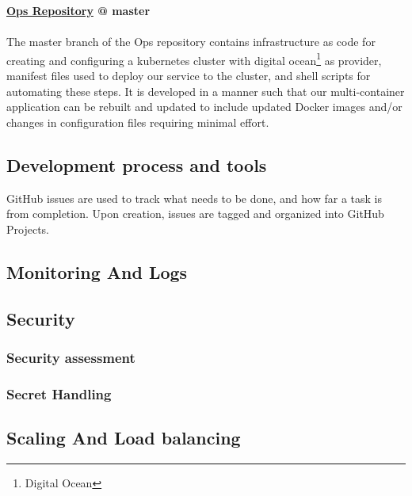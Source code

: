 \textbf{\hyperref[app:opsRepo]{Ops Repository} @ master}\\\\
The master branch of the Ops repository contains infrastructure as code for creating and configuring a kubernetes cluster with digital ocean\footnote{Digital Ocean\cite{Digitalocean}} as provider, manifest files used to deploy our service to the cluster, and shell scripts for automating these steps. It is developed in a manner such that our multi-container application can be rebuilt and updated to include updated Docker images and/or changes in configuration files requiring minimal effort.

\subsection{Development process and tools}
\label{subsec:process&tools}
 GitHub issues are used to track what needs to be done, and how far a task is from completion. Upon creation, issues are tagged and organized into GitHub Projects.

\subsection{Monitoring And Logs}
\label{subsec:monitoring}

\subsection{Security}
\label{subsec:security}

\subsubsection{Security assessment}
\label{subsubsec:security}

\subsubsection{Secret Handling}
\label{subsubsec:secrets}


\subsection{Scaling And Load balancing}
\label{subsec:scaling}

